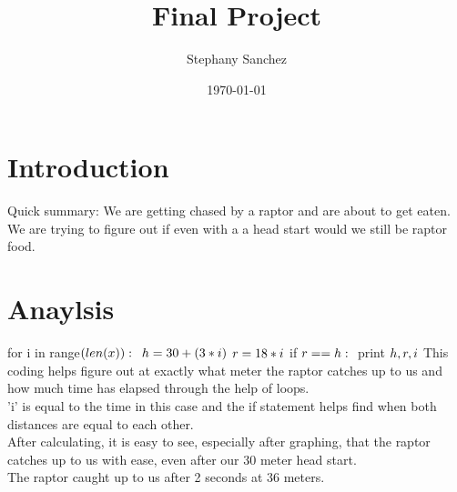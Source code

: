 \documentclass[twocolumn]{article}
\begin{document}
\title{
Final Project
}

\author{Stephany Sanchez}


\date{\today}




\maketitle{}


\section{Introduction}
Quick summary: We are getting chased by a raptor and are about to get eaten. We are trying to figure out if even with a a head start would we still be raptor food.

\section{Anaylsis}

for i in range$(len(x)):\\$
 $  h = 30 + (3*i)\\$
    $r = 18*i\\$
    if $r==h:\\$
        print $ h,r,i\\$
This coding helps figure out at exactly what meter the raptor catches up to us and how much time has elapsed through the help of loops.\\
'i' is equal to the time in this case and the if statement helps find when both distances are equal to each other.\\
After calculating, it is easy to see, especially after graphing, that the raptor catches up to us with ease, even after our 30 meter head start.\\

The raptor caught up to us after 2 seconds at 36 meters.\\
\end{document}
